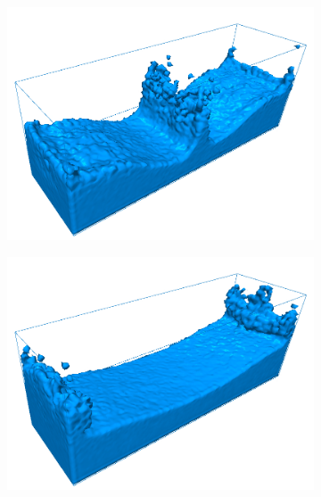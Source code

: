 \begin{figure}[h!]
\begin{subfigure}[t]{.3\textwidth}
        	\includegraphics[scale=0.65]{obrazky-figures/app/Blocks03.jpg}
        	\label{fig:GaussSeidl}
	\end{subfigure}%
		\begin{subfigure}[t]{.3\textwidth}
			\centering
        	\includegraphics[scale=0.65]{obrazky-figures/app/Blocks04.jpg}
        	\label{fig:GaussSeidl}
	\end{subfigure}%
		\begin{subfigure}[t]{.3\textwidth}
			\centering

\end{subfigure}
\end{figure}
